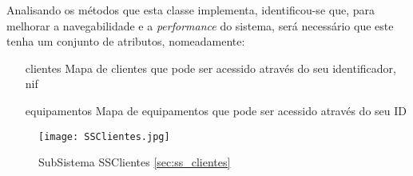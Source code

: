 \documentclass[../../relatorio.tex]{subfiles}
\begin{document}
Analisando os métodos que esta classe implementa, identificou-se que, para melhorar a navegabilidade
e a \textit{performance} do sistema, será necessário que este tenha um conjunto de atributos, nomeadamente:
\begin{itemize}
    \item[clientes]{Mapa de clientes que pode ser acessido através do seu identificador, nif}
    \item[equipamentos]{Mapa de equipamentos que pode ser acessido através do seu ID} 
\end{itemize}

\begin{figure}[!ht]
    \centering
    \texttt{[image: SSClientes.jpg]}
    \caption{SubSistema SSClientes \ref{sec:ss_clientes}}
\end{figure}
\end{document}

